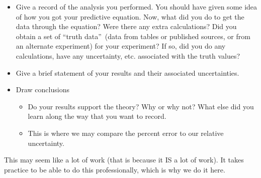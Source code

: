 \begin{itemize}
\item Give a record of the analysis you performed. You should have given
some idea of how you got your predictive equation. Now, what did you do to
get the data through the equation? Were there any extra calculations? Did
you obtain a set of \textquotedblleft truth data\textquotedblright\ (data
from tables or published sources, or from an alternate experiment) for your
experiment? If so, did you do any calculations, have any uncertainty, etc.
associated with the truth values?

\item Give a brief statement of your results and their associated
uncertainties.

\item Draw conclusions

\begin{itemize}
\item Do your results support the theory? Why or why not? What else did you
learn along the way that you want to record.

\item This is where we may compare the percent error to our relative
uncertainty.
\end{itemize}
\end{itemize}

This may seem like a lot of work (that is because it IS a lot of work). It
takes practice to be able to do this professionally, which is why we do it
here.
